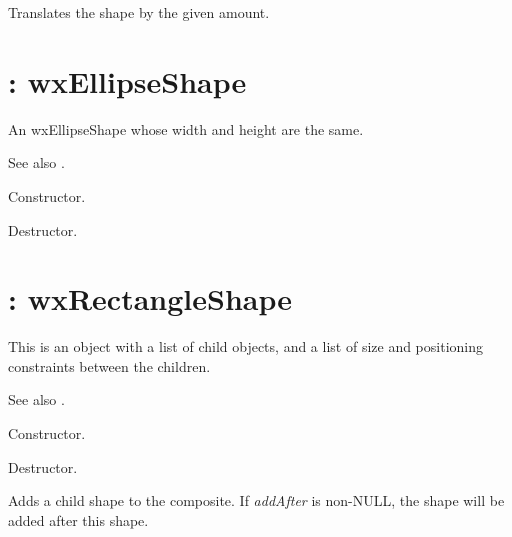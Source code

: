 

Translates the shape by the given amount.

\section{: wxEllipseShape}\label{wxcircleshape}

An wxEllipseShape whose width and height are the same.

See also .



Constructor.



Destructor.


\section{: wxRectangleShape}\label{wxcompositeshape}


This is an object with a list of child objects, and a list of size
and positioning constraints between the children.

See also .



Constructor.



Destructor.

\label{wxcompositeshapeaddchild}


Adds a child shape to the composite. If {\it addAfter} is non-NULL, the shape will be added
after this shape.

